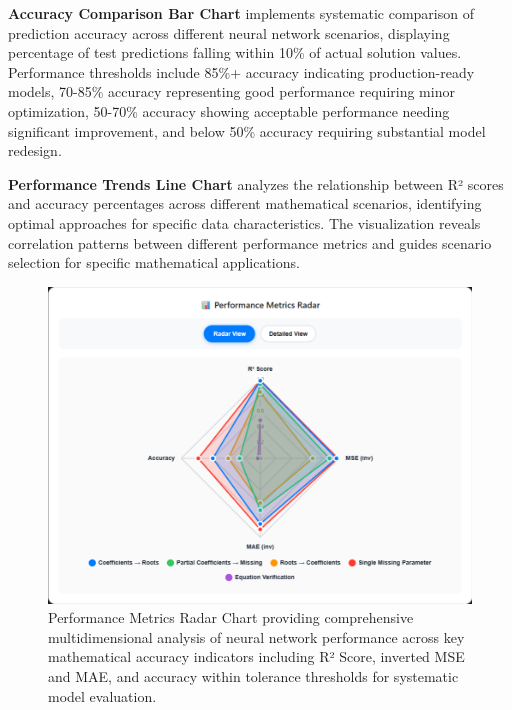 \documentclass[11pt,a4paper]{report}
\begin{document}
\textbf{Accuracy Comparison Bar Chart} implements systematic comparison of prediction accuracy across different neural network scenarios, displaying percentage of test predictions falling within 10\% of actual solution values. Performance thresholds include 85\%+ accuracy indicating production-ready models, 70-85\% accuracy representing good performance requiring minor optimization, 50-70\% accuracy showing acceptable performance needing significant improvement, and below 50\% accuracy requiring substantial model redesign.

\textbf{Performance Trends Line Chart} analyzes the relationship between R² scores and accuracy percentages across different mathematical scenarios, identifying optimal approaches for specific data characteristics. The visualization reveals correlation patterns between different performance metrics and guides scenario selection for specific mathematical applications.

\begin{figure}[H]
\centering
\includegraphics[width=\textwidth]{quadratic_predictor_performance_radar.png}
\caption{Performance Metrics Radar Chart providing comprehensive multidimensional analysis of neural network performance across key mathematical accuracy indicators including R² Score, inverted MSE and MAE, and accuracy within tolerance thresholds for systematic model evaluation.}
\label{fig:quadratic_radar}
\end{figure}
\end{document}
